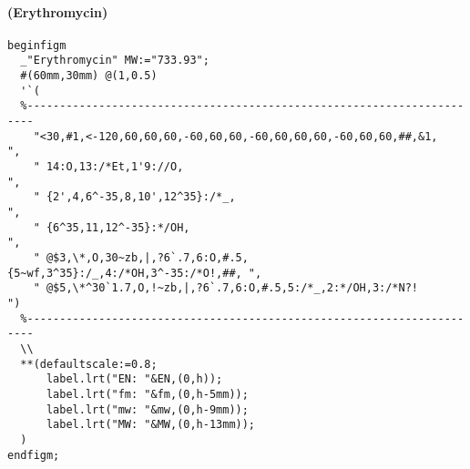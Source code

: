 \documentclass[a4paper]{article}
\begin{document}
\paragraph{(Erythromycin)}
\begin{verbatim}
beginfigm
  _"Erythromycin" MW:="733.93";
  #(60mm,30mm) @(1,0.5)
  '`(
  %-----------------------------------------------------------------------
    "<30,#1,<-120,60,60,60,-60,60,60,-60,60,60,60,-60,60,60,##,&1,        ",
    " 14:O,13:/*Et,1'9://O,                                               ",
    " {2',4,6^-35,8,10',12^35}:/*_,                                       ",
    " {6^35,11,12^-35}:*/OH,                                              ",
    " @$3,\*,O,30~zb,|,?6`.7,6:O,#.5,{5~wf,3^35}:/_,4:/*OH,3^-35:/*O!,##, ",
    " @$5,\*^30`1.7,O,!~zb,|,?6`.7,6:O,#.5,5:/*_,2:*/OH,3:/*N?!           ")
  %-----------------------------------------------------------------------
  \\
  **(defaultscale:=0.8;
      label.lrt("EN: "&EN,(0,h));
      label.lrt("fm: "&fm,(0,h-5mm));
      label.lrt("mw: "&mw,(0,h-9mm));
      label.lrt("MW: "&MW,(0,h-13mm));
  )
endfigm;
\end{verbatim}
\end{document}
